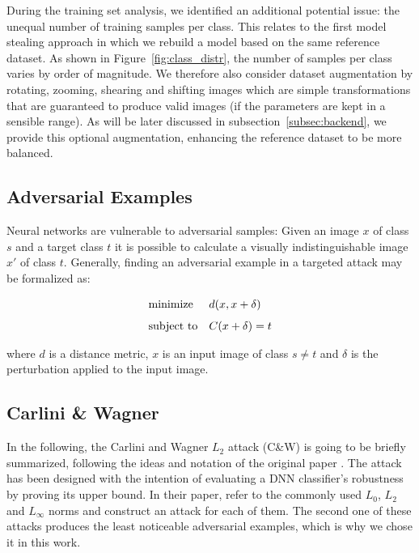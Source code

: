 During the training set analysis, we identified an additional potential issue: the unequal number of training samples per class.
This relates to the first model stealing approach in which we rebuild a model based on the same reference dataset.
As shown in Figure~\ref{fig:class_distr}, the number of samples per class varies by order of magnitude.
We therefore also consider dataset augmentation by rotating, zooming, shearing and shifting images which are simple transformations that are guaranteed to produce valid images (if the parameters are kept in a sensible range).
As will be later discussed in subsection~\ref{subsec:backend}, we provide this optional augmentation, enhancing the reference dataset to be more balanced.

\subsection{Adversarial Examples}


Neural networks are vulnerable to adversarial samples: Given an image $x$ of class $s$ and a target class $t$ it is possible to calculate a visually indistinguishable image $x'$ of class $t$. Generally, finding an adversarial example in a targeted attack may be formalized as:

\begin{equation}
\label{eq:general_opt}
\begin{aligned} & \underset{}{\text{minimize}} & & d(x, x+\delta) \\ & \text{subject to} & & C(x + \delta) = t \end{aligned}
\end{equation}

where $d$ is a distance metric, $x$ is an input image of class $s \neq t$ and $\delta$ is the perturbation applied to the input image.

\subsection{Carlini \& Wagner}\label{subsec:cwl2}
In the following, the Carlini and Wagner $L_2$ attack (C\&W) is going to be briefly summarized, following the ideas and notation of the original paper \cite{carlini2017towards}.
The attack has been designed with the intention of evaluating a DNN classifier's robustness by proving its upper bound.
In their paper, \citeauthor{carlini2017towards} refer to the commonly used $L_0$, $L_2$ and $L_\infty$ norms and construct an attack for each of them.
The second one of these attacks produces the least noticeable adversarial examples, which is why we chose it in this work.

